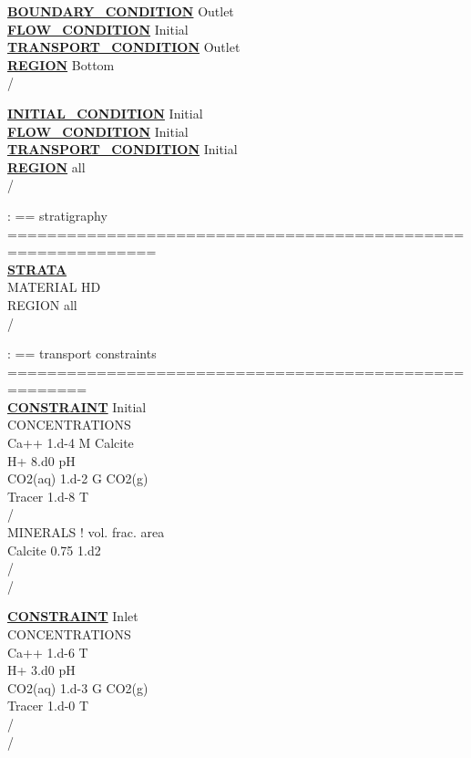 \noindent
\hyperlink{target_bcon}{\bf BOUNDARY\_CONDITION} Outlet\\
\hyperlink{target_flow_cond}{\bf FLOW\_CONDITION} Initial\\
\hyperlink{target_trans_cond}{\bf TRANSPORT\_CONDITION} Outlet\\
\hyperlink{target_region}{\bf REGION} Bottom\\
/

\noindent
\hyperlink{target_init}{\bf INITIAL\_CONDITION} Initial\\
\hyperlink{target_flow_cond}{\bf FLOW\_CONDITION} Initial\\
\hyperlink{target_trans_cond}{\bf TRANSPORT\_CONDITION} Initial\\
\hyperlink{target_region}{\bf REGION} all\\
/

\noindent
: == stratigraphy =============================================================\\
\hyperlink{target_strata}{\bf STRATA}\\
MATERIAL HD\\
REGION all\\
/

\noindent
: == transport constraints ======================================================\\
\hyperlink{target_constraint}{\bf CONSTRAINT} Initial\\
CONCENTRATIONS\\
Ca++    1.d-4   M  Calcite\\
H+      8.d0   pH\\
CO2(aq) 1.d-2   G  CO2(g)\\
Tracer  1.d-8   T\\
/\\
MINERALS ! vol. frac.  area\\
Calcite      0.75      1.d2\\
/\\
/

\noindent
\hyperlink{target_constraint}{\bf CONSTRAINT} Inlet\\
CONCENTRATIONS\\
Ca++    1.d-6   T\\
H+      3.d0   pH\\
CO2(aq) 1.d-3   G  CO2(g)\\
Tracer  1.d-0   T\\
/\\
/
\normalsize

\newpage
\protect\hypertarget{target_bcon}{}

